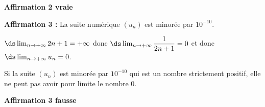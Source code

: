 \begin{list}{\textbullet}{}
\hfill\textbf{Affirmation 2 vraie}

\item \textbf{Affirmation 3 :} \og{}La suite numérique $\left(u_{n}\right)$ est minorée par $10^{-10}$.\fg{}

$\ds\lim_{n\to +\infty} 2n+1=+\infty$ donc $\ds\lim_{n\to +\infty} \dfrac{1}{2n+1}=0$ et donc $\ds\lim_{n\to +\infty} u_n=0$.

Si la suite $(u_n)$ est minorée par $10^{-10}$ qui est un nombre strictement positif, elle ne peut pas avoir pour limite le nombre 0.

\hfill\textbf{Affirmation 3 fausse}

\end{list}
